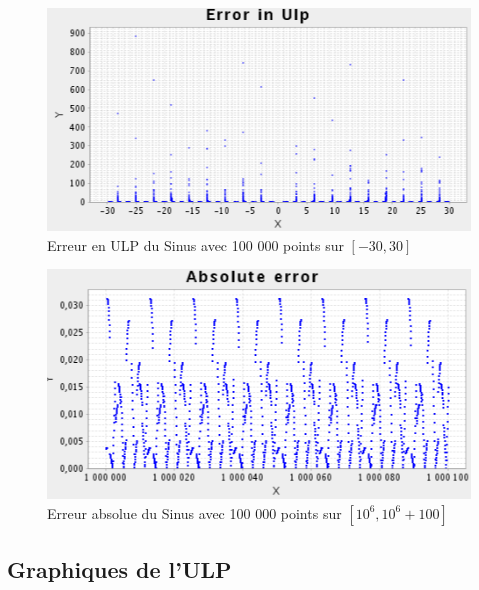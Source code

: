 \documentclass[12pt]{article}
\begin{document}
\begin{figure}[h!]
  \begin{center}
    \includegraphics[scale=0.33]{sinus_ulp.png}
    \caption{Erreur en ULP du Sinus avec 100 000 points sur $[-30,30]$}
    \label{Erreur en ULP du Sinus avec 100 000 points sur $[-30,30]$}
  \end{center}
\end{figure}
\begin{figure}[h!]
  \begin{center}
    \includegraphics[scale=0.33]{sinus_far.png}
    \caption{Erreur absolue du Sinus avec 100 000 points sur $[10^6,10^6+100]$}
    \label{Erreur absolue du Sinus avec 100 000 points sur $[10^6,10^6+100]$}
  \end{center}
\end{figure}

\newpage

\subsection{Graphiques de l'ULP}
\end{document}
